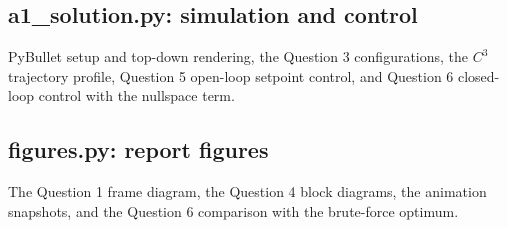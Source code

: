 \documentclass[11pt]{article}
\begin{document}
\subsection*{a1\_solution.py: simulation and control}
PyBullet setup and top-down rendering, the Question 3 configurations, the $C^3$ trajectory profile, Question 5 open-loop setpoint control, and Question 6 closed-loop control with the nullspace term.


\subsection*{figures.py: report figures}
The Question 1 frame diagram, the Question 4 block diagrams, the animation snapshots, and the Question 6 comparison with the brute-force optimum.

\end{document}
